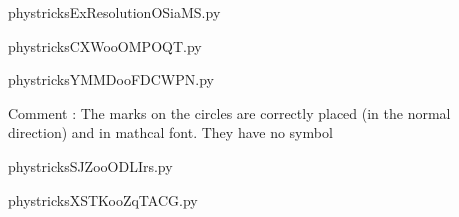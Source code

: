 
    \newcommand{\CaptionFigExResolutionOSiaMS}{<+Type your caption here+>}
    \begin{center}
        
    \end{center}
    phystricksExResolutionOSiaMS.py

    

    \clearpage
    


    \newcommand{\CaptionFigCXWooOMPOQT}{<+Type your caption here+>}
    \begin{center}
        
    \end{center}
    phystricksCXWooOMPOQT.py

    

    \clearpage
    


    \newcommand{\CaptionFigYMMDooFDCWPN}{<+Type your caption here+>}
    \begin{center}
        
    \end{center}
    phystricksYMMDooFDCWPN.py

    Comment : The marks on the circles are correctly placed (in the normal direction) and in mathcal font. They have no symbol

    \clearpage
    


    \newcommand{\CaptionFigSJZooODLIrs}{<+Type your caption here+>}
    \begin{center}
        
    \end{center}
    phystricksSJZooODLIrs.py

    

    \clearpage
    


    \newcommand{\CaptionFigXSTKooZqTACG}{<+Type your caption here+>}
    \begin{center}
        
    \end{center}
    phystricksXSTKooZqTACG.py

    

    \clearpage
    


